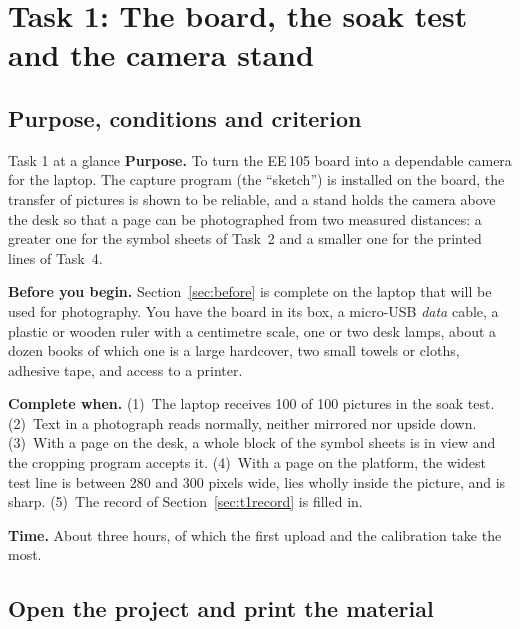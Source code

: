 \section{Task 1: The board, the soak test and the camera stand}
\label{sec:t1}

\subsection{Purpose, conditions and criterion}

\begin{plain}{Task 1 at a glance}
\textbf{Purpose.} To turn the EE\,105 board into a dependable camera for the laptop. The capture
program (the ``sketch'') is installed on the board, the transfer of pictures is shown to be
reliable, and a stand holds the camera above the desk so that a page can be photographed from
two measured distances: a greater one for the symbol sheets of Task~2 and a smaller one for the
printed lines of Task~4.

\textbf{Before you begin.} Section~\ref{sec:before} is complete on the laptop that will be used
for photography. You have the board in its box, a micro-USB \emph{data} cable, a plastic or
wooden ruler with a centimetre scale, one or two desk lamps, about a dozen books of which one is a
large hardcover, two small towels or cloths, adhesive tape, and access to a printer.

\textbf{Complete when.} (1)~The laptop receives 100 of 100 pictures in the soak test.
(2)~Text in a photograph reads normally, neither mirrored nor upside down. (3)~With a page on
the desk, a whole block of the symbol sheets is in view and the cropping program accepts it.
(4)~With a page on the platform, the widest test line is between 280 and 300 pixels wide, lies
wholly inside the picture, and is sharp. (5)~The record of Section~\ref{sec:t1record} is filled
in.

\textbf{Time.} About three hours, of which the first upload and the calibration take the most.
\end{plain}

\subsection{Open the project and print the material}

\label{st:t1open}


